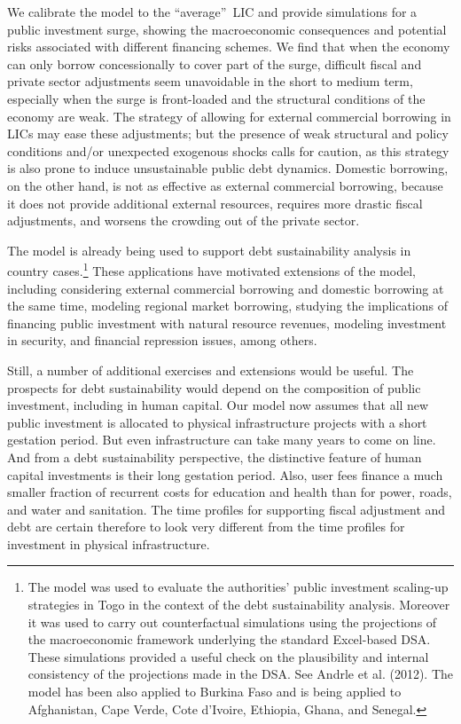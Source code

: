 \documentclass[11pt]{article}
\begin{document}
We calibrate the model to the \textquotedblleft average\textquotedblright\
LIC and provide simulations for a public investment surge, showing the
macroeconomic consequences and potential risks associated with different
financing schemes. We find that when the economy can only borrow
concessionally to cover part of the surge, difficult fiscal and private
sector adjustments seem unavoidable in the short to medium term, especially
when the surge is front-loaded and the structural conditions of the economy
are weak. The strategy of allowing for external commercial borrowing in LICs
may ease these adjustments; but the presence of weak structural and policy
conditions and/or unexpected exogenous shocks calls for caution, as this
strategy is also prone to induce unsustainable public debt dynamics.
Domestic borrowing, on the other hand, is not as effective as external
commercial borrowing, because it does not provide additional external
resources, requires more drastic fiscal adjustments, and worsens the
crowding out of the private sector.

The model is already being used to support debt sustainability analysis in
country cases.\footnote{%
The model was used to evaluate the authorities' public investment scaling-up
strategies in Togo in the context of the debt sustainability analysis.
Moreover it was used to carry out counterfactual simulations using the
projections of the macroeconomic framework underlying the standard
Excel-based DSA. These simulations provided a useful check on the
plausibility and internal consistency of the projections made in the DSA.
See Andrle et al. (2012). The model has been also applied to Burkina Faso
and is being applied to Afghanistan, Cape Verde, Cote d'Ivoire, Ethiopia,
Ghana, and Senegal.} These applications have motivated extensions of the
model, including considering external commercial borrowing and domestic
borrowing at the same time, modeling regional market borrowing, studying the
implications of financing public investment with natural resource revenues,
modeling investment in security, and financial repression issues, among
others.

Still, a number of additional exercises and extensions would be useful. The
prospects for debt sustainability would depend on the composition of public
investment, including in human capital. Our model now assumes that all new
public investment is allocated to physical infrastructure projects with a
short gestation period. But even infrastructure can take many years to come
on line. And from a debt sustainability perspective, the distinctive feature
of human capital investments is their long gestation period. Also, user fees
finance a much smaller fraction of recurrent costs for education and health
than for power, roads, and water and sanitation. The time profiles for
supporting fiscal adjustment and debt are certain therefore to look very
different from the time profiles for investment in physical infrastructure.
\end{document}
